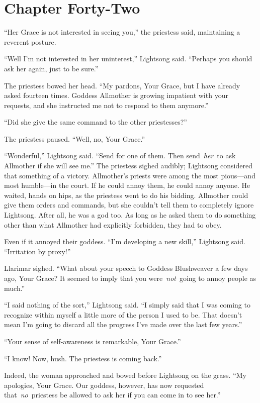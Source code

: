 \section{Chapter Forty-Two}

“Her Grace is not interested in seeing you,” the priestess said, maintaining a reverent posture.

“Well I’m not interested in her uninterest,” Lightsong said. “Perhaps you should ask her again, just to be sure.”

The priestess bowed her head. “My pardons, Your Grace, but I have already asked fourteen times. Goddess Allmother is growing impatient with your requests, and she instructed me not to respond to them anymore.”

“Did she give the same command to the other priestesses?”

The priestess paused. “Well, no, Your Grace.”

“Wonderful,” Lightsong said. “Send for one of them. Then send~\textit{her}~to ask Allmother if she will see me.” The priestess sighed audibly; Lightsong considered that something of a victory. Allmother’s priests were among the most pious—and most humble—in the court. If he could annoy them, he could annoy anyone. He waited, hands on hips, as the priestess went to do his bidding. Allmother could give them orders and commands, but she couldn’t tell them to completely ignore Lightsong. After all, he was a god too. As long as he asked them to do something other than what Allmother had explicitly forbidden, they had to obey.

Even if it annoyed their goddess. “I’m developing a new skill,” Lightsong said. “Irritation by proxy!”

Llarimar sighed. “What about your speech to Goddess Blushweaver a few days ago, Your Grace? It seemed to imply that you were~\textit{not}~going to annoy people as much.”

“I said nothing of the sort,” Lightsong said. “I simply said that I was coming to recognize within myself a little more of the person I used to be. That doesn’t mean I’m going to discard all the progress I’ve made over the last few years.”

“Your sense of self-awareness is remarkable, Your Grace.”

“I know! Now, hush. The priestess is coming back.”

Indeed, the woman approached and bowed before Lightsong on the grass. “My apologies, Your Grace. Our goddess, however, has now requested that~\textit{no}~priestess be allowed to ask her if you can come in to see her.”

